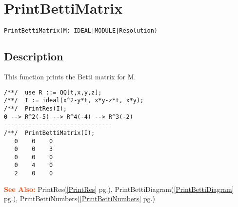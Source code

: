 \documentclass[a4paper]{mybook}
\newenvironment{command}{}{} %
\newcommand\SeeAlso{\par\textcolor{OrangeRed}{\textbf{\large See Also: }}}
\begin{document}
\section{PrintBettiMatrix}
\label{PrintBettiMatrix}
\begin{command} %


\begin{Verbatim}[label=syntax, rulecolor=\color{MidnightBlue},
frame=single]
PrintBettiMatrix(M: IDEAL|MODULE|Resolution)
\end{Verbatim}


\subsection*{Description}

This function prints the Betti matrix for M.
\begin{Verbatim}[label=example, rulecolor=\color{PineGreen}, frame=single]
/**/  use R ::= QQ[t,x,y,z];
/**/  I := ideal(x^2-y*t, x*y-z*t, x*y);
/**/  PrintRes(I);
0 --> R^2(-5) --> R^4(-4) --> R^3(-2)
-------------------------------
/**/  PrintBettiMatrix(I);
   0    0    0
   0    0    3
   0    0    0
   0    4    0
   2    0    0
\end{Verbatim}


\SeeAlso %
  PrintRes(\ref{PrintRes} pg.\pageref{PrintRes}), 
    PrintBettiDiagram(\ref{PrintBettiDiagram} pg.\pageref{PrintBettiDiagram}), 
    PrintBettiNumbers(\ref{PrintBettiNumbers} pg.\pageref{PrintBettiNumbers})
\end{command} %
\end{document}
